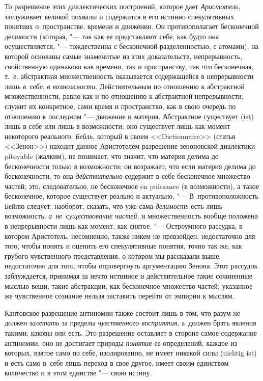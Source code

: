 То разрешение этих диалектических построений, которое дает {\em Аристотель},
заслуживает великой похвалы и содержится в его истинно спекулятивных понятиях
о~пространстве, времени и движении. Он противополагает бесконечной делимости
(которая, "--- так как ее представляют себе, как будто она осуществляется, "---
тождественна с бесконечной разделенностью, с атомами), на которой основаны
самые знаменитые из этих доказательств, непрерывность, свойственную одинаково
как времени, так и пространству, так что бесконечная, т.~е. абстрактная
множественность оказывается содержащейся в непрерывности лишь {\em в~себе},
{\em в возможности}. Действительным по отношению к абстрактной множественности,
равно как и по отношению к абстрактной непрерывности, служит их конкретное,
сами время и пространство, как в свою очередь по отношению к последним "---
движение и материя. Абстрактное существует (ist) лишь в себе или лишь в
возможности; оно существует лишь как момент некоторого реального. {\em Бейль},
который в своем <<Dic\-tion\-naire>> (статья <<Зенон>>) находит данное
Аристотелем разрешение зеноновской диалектики pitoyable (жалким), не понимает,
что значит, что материя делима до бесконечности только в возможности; он
возражает, что если материя делима до бесконечности, то она {\em действительно}
содержит в себе бесконечное множество частей; это, следовательно, не
бесконечное en puissance (в возможности), а такое бесконечное, которое
существует реально и актуально. "--- В~противоположность Бейлю следует,
наоборот, сказать, что уже сама {\em делимость} есть лишь возможность,
{\em а~не~существование частей}, и множественность вообще положена в
непрерывности лишь как момент, как снятое. "--- Остроумного рассудка, в котором
Аристотель, несомненно, также никем не превзойден, недостаточно для того, чтобы
понять и оценить его спекулятивные понятия, точно так же, как грубого
чувственного представления, о котором мы рассказали выше, недостаточно для
того, чтобы опровергнуть аргументацию Зенона. Этот рассудок заблуждается,
принимая за нечто истинное и действительное такие сочиненные мыслью вещи, такие
абстракции, как бесконечное множество частей; указанное же чувственное сознание
нельзя заставить перейти от эмпирии к мыслям.

Кантовское разрешение антиномии также состоит лишь в том, что разум не должен
{\em залетать} за пределы {\em чувственного восприятия}, а~должен брать явления
такими, каковы они есть. Это разрешение оставляет в стороне самое содержание
антиномии; оно не достигает природы {\em понятия} ее определений, каждое из
которых, взятое само по себе, изолированно, не имеет никакой силы (nich\-tig
ist) и есть само в~себе лишь переход в свое другое, имеет своим единством
количество и в этом единстве "--- свою истину.\label{bkm:bm88b}

